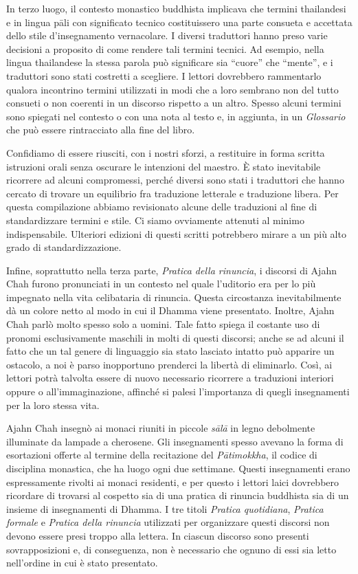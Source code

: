 In terzo luogo, il contesto monastico buddhista implicava che termini
thailandesi e in lingua pāli con significato tecnico costituissero una
parte consueta e accettata dello stile d'insegnamento vernacolare. I
diversi traduttori hanno preso varie decisioni a proposito di come
rendere tali termini tecnici. Ad esempio, nella lingua thailandese la
stessa parola può significare sia ``cuore'' che ``mente'', e i
traduttori sono stati costretti a scegliere. I lettori dovrebbero
rammentarlo qualora incontrino termini utilizzati in modi che a loro
sembrano non del tutto consueti o non coerenti in un discorso rispetto a
un altro. Spesso alcuni termini sono spiegati nel contesto o con una
nota al testo e, in aggiunta, in un \emph{Glossario} che può essere
rintracciato alla fine del libro.

Confidiamo di essere riusciti, con i nostri sforzi, a restituire in
forma scritta istruzioni orali senza oscurare le intenzioni del maestro.
È stato inevitabile ricorrere ad alcuni compromessi, perché diversi sono
stati i traduttori che hanno cercato di trovare un equilibrio fra
traduzione letterale e traduzione libera. Per questa compilazione
abbiamo revisionato alcune delle traduzioni al fine di standardizzare
termini e stile. Ci siamo ovviamente attenuti al minimo indispensabile.
Ulteriori edizioni di questi scritti potrebbero mirare a un più alto
grado di standardizzazione.

Infine, soprattutto nella terza parte, \emph{Pratica della rinuncia}, i
discorsi di Ajahn Chah furono pronunciati in un contesto nel quale
l'uditorio era per lo più impegnato nella vita celibataria di rinuncia.
Questa circostanza inevitabilmente dà un colore netto al modo in cui il
Dhamma viene presentato. Inoltre, Ajahn Chah parlò molto spesso solo a
uomini. Tale fatto spiega il costante uso di pronomi esclusivamente
maschili in molti di questi discorsi; anche se ad alcuni il fatto che un
tal genere di linguaggio sia stato lasciato intatto può apparire un
ostacolo, a noi è parso inopportuno prenderci la libertà di eliminarlo.
Così, ai lettori potrà talvolta essere di nuovo necessario ricorrere a
traduzioni interiori oppure o all'immaginazione, affinché si palesi
l'importanza di quegli insegnamenti per la loro stessa vita.

Ajahn Chah insegnò ai monaci riuniti in piccole \emph{sālā} in legno
debolmente illuminate da lampade a cherosene. Gli insegnamenti spesso
avevano la forma di esortazioni offerte al termine della recitazione del
\emph{Pātimokkha}, il codice di disciplina monastica, che ha luogo ogni
due settimane. Questi insegnamenti erano espressamente rivolti ai monaci
residenti, e per questo i lettori laici dovrebbero ricordare di trovarsi
al cospetto sia di una pratica di rinuncia buddhista sia di un insieme
di insegnamenti di Dhamma. I tre titoli \emph{Pratica quotidiana},
\emph{Pratica formale} e \emph{Pratica della rinuncia} utilizzati per
organizzare questi discorsi non devono essere presi troppo alla lettera.
In ciascun discorso sono presenti sovrapposizioni e, di conseguenza, non
è necessario che ognuno di essi sia letto nell'ordine in cui è stato
presentato.

